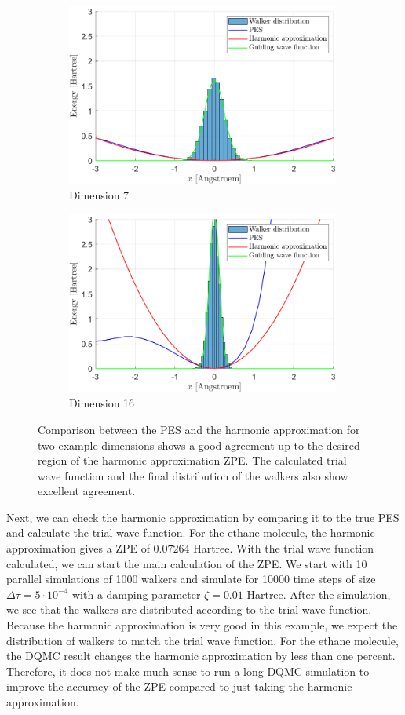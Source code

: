 \documentclass [12pt]{report}
\begin{document}
\begin{figure}[h]
\begin{subfigure}{0.5\textwidth}
\includegraphics[width=0.9\linewidth, height=6cm]{walkers1.png} 
\caption{Dimension 7}
\label{dim7}
\end{subfigure}
\begin{subfigure}{0.5\textwidth}
\includegraphics[width=0.9\linewidth, height=6cm]{walkers2.png}
\caption{Dimension 16}
\label{dim16}
\end{subfigure}
\caption{Comparison between the PES and the harmonic approximation for two example dimensions shows a good agreement up to the desired region of the harmonic approximation ZPE. The calculated trial wave function and the final distribution of the walkers also show excellent agreement.}
\label{trialwf}
\end{figure}
Next, we can check the harmonic approximation by comparing it to the true PES and calculate the trial wave function. For the ethane molecule, the harmonic approximation gives a ZPE of $0.07264$ Hartree. With the trial wave function calculated, we can start the main calculation of the ZPE. We start with 10 parallel simulations of 1000 walkers and simulate for 10000 time steps of size $\Delta \tau = 5 \cdot 10^{-4}$ with a damping parameter $\zeta = 0.01$ Hartree. After the simulation, we see that the walkers are distributed according to the trial wave function. Because the harmonic approximation is very good in this example, we expect the distribution of walkers to match the trial wave function. For the ethane molecule, the DQMC result  changes the harmonic approximation by less than one percent. Therefore, it does not make much sense to run a long DQMC simulation to improve the accuracy of the ZPE compared to just taking the harmonic approximation.
\end{document}

